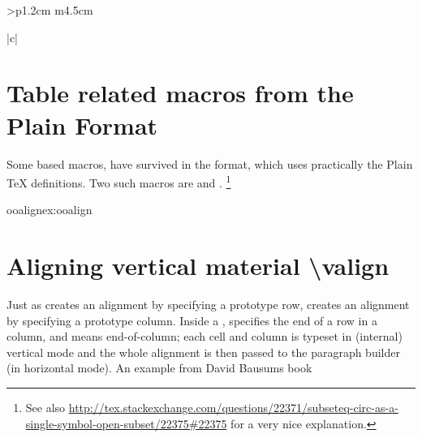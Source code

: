 \begin{tabular}{>{\bfseries}p{1.2cm} m{4.5cm}}
\begin{tabular}[t]{|c|}
\begin{longtable}
\begin{scriptexample}{}{}
\section{Table related macros from the Plain Format}

Some  based macros, have survived in the \latexe format, which uses practically the Plain TeX definitions. Two such macros are  and . \footnote{See also \protect\url{http://tex.stackexchange.com/questions/22371/subseteq-circ-as-a-single-symbol-open-subset/22375\#22375} for a very nice explanation.}

\begin{texexample}{ooalign}{ex:ooalign}
\end{texexample}




\section{Aligning vertical material \textbackslash valign}


Just as \cmd{\halign} creates an alignment by specifying a prototype row, \cmd{\valign} creates an alignment by specifying a prototype column. Inside a \cmd{\valign}, \cmd{\textand} specifies the end of a row in a column, and \cmd{\cr} means end-of-column; each cell and column is typeset in (internal) vertical mode and the whole alignment is then passed to the paragraph builder (in horizontal mode).  An example from David Bausums book

\medskip



\begin{teXXX}
\bye
\end{teXXX}
\bigskip

\topline

\bottomline


\end{scriptexample}
\end{longtable}
\end{tabular}
\end{tabular}
